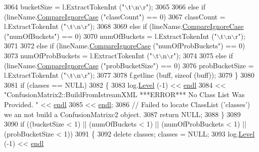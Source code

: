\begin{DoxyCode}
3064       bucketSize = l.ExtractTokenInt (\textcolor{stringliteral}{"\(\backslash\)t\(\backslash\)n\(\backslash\)r"});
3065 
3066     \textcolor{keywordflow}{else} \textcolor{keywordflow}{if}  (lineName.\hyperlink{class_k_k_b_1_1_k_k_str_a3fd779d448f27e24170c9c05fca5208e}{CompareIgnoreCase} (\textcolor{stringliteral}{"classCount"}) == 0)
3067       classCount = l.ExtractTokenInt (\textcolor{stringliteral}{"\(\backslash\)t\(\backslash\)n\(\backslash\)r"});
3068 
3069     \textcolor{keywordflow}{else} \textcolor{keywordflow}{if}  (lineName.\hyperlink{class_k_k_b_1_1_k_k_str_a3fd779d448f27e24170c9c05fca5208e}{CompareIgnoreCase} (\textcolor{stringliteral}{"numOfBuckets"}) == 0)
3070       numOfBuckets = l.ExtractTokenInt (\textcolor{stringliteral}{"\(\backslash\)t\(\backslash\)n\(\backslash\)r"});
3071 
3072     \textcolor{keywordflow}{else} \textcolor{keywordflow}{if}  (lineName.\hyperlink{class_k_k_b_1_1_k_k_str_a3fd779d448f27e24170c9c05fca5208e}{CompareIgnoreCase} (\textcolor{stringliteral}{"numOfProbBuckets"}) == 0)
3073       numOfProbBuckets = l.ExtractTokenInt (\textcolor{stringliteral}{"\(\backslash\)t\(\backslash\)n\(\backslash\)r"});
3074 
3075     \textcolor{keywordflow}{else} \textcolor{keywordflow}{if}  (lineName.\hyperlink{class_k_k_b_1_1_k_k_str_a3fd779d448f27e24170c9c05fca5208e}{CompareIgnoreCase} (\textcolor{stringliteral}{"probBucketSize"}) == 0)
3076       probBucketSize = l.ExtractTokenInt (\textcolor{stringliteral}{"\(\backslash\)t\(\backslash\)n\(\backslash\)r"});
3077 
3078     f.getline (buff, \textcolor{keyword}{sizeof} (buff));
3079   \}
3080 
3081   \textcolor{keywordflow}{if}  (classes == NULL)
3082   \{
3083     log.\hyperlink{class_k_k_b_1_1_run_log_a32cf761d7f2e747465fd80533fdbb659}{Level} (-1) << \hyperlink{namespace_k_k_b_ad1f50f65af6adc8fa9e6f62d007818a8}{endl} 
3084                    << \textcolor{stringliteral}{"ConfusionMatrix2::BuildFromIstreamXML     ***ERROR***    No Class List Was Provided.
      "}  << \hyperlink{namespace_k_k_b_ad1f50f65af6adc8fa9e6f62d007818a8}{endl}
3085                    << \hyperlink{namespace_k_k_b_ad1f50f65af6adc8fa9e6f62d007818a8}{endl};
3086     \textcolor{comment}{// Failed to locate ClassList ('classes')  we an not build a ConfusionMatrixc2 object.}
3087     \textcolor{keywordflow}{return} NULL;
3088   \}
3089 
3090   \textcolor{keywordflow}{if}  ((bucketSize < 1)  ||  (numOfBuckets < 1)  ||  (numOfProbBuckets < 1)  ||  (probBucketSize < 1))
3091   \{
3092     \textcolor{keyword}{delete}  classes;  classes = NULL;
3093     log.\hyperlink{class_k_k_b_1_1_run_log_a32cf761d7f2e747465fd80533fdbb659}{Level} (-1) << \hyperlink{namespace_k_k_b_ad1f50f65af6adc8fa9e6f62d007818a8}{endl} 

\end{DoxyCode}
